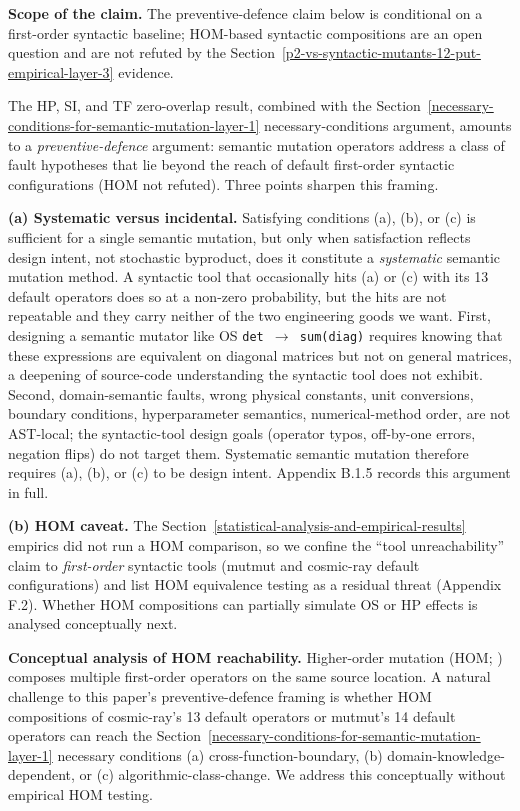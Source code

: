 \documentclass[manuscript,screen,review]{acmart}
\begin{document}
\textbf{Scope of the claim.} The preventive-defence claim below is
conditional on a first-order syntactic baseline; HOM-based syntactic
compositions are an open question and are not refuted by the Section~\ref{p2-vs-syntactic-mutants-12-put-empirical-layer-3}
evidence.

The HP, SI, and TF zero-overlap result, combined with the Section~\ref{necessary-conditions-for-semantic-mutation-layer-1}
necessary-conditions argument, amounts to a \emph{preventive-defence}
argument: semantic mutation operators address a class of fault
hypotheses that lie beyond the reach of default first-order syntactic
configurations (HOM not refuted). Three points sharpen
this framing.

\textbf{(a) Systematic versus incidental.} Satisfying conditions (a),
(b), or (c) is sufficient for a single semantic mutation, but only when
satisfaction reflects design intent, not stochastic byproduct, does it
constitute a \emph{systematic} semantic mutation method. A syntactic
tool that occasionally hits (a) or (c) with its 13 default operators
does so at a non-zero probability, but the hits are not repeatable and
they carry neither of the two engineering goods we want. First,
designing a semantic mutator like OS \texttt{det\ $\to$\ sum(diag)} requires
knowing that these expressions are equivalent on diagonal matrices but
not on general matrices, a deepening of source-code understanding the
syntactic tool does not exhibit. Second, domain-semantic faults, wrong
physical constants, unit conversions, boundary conditions,
hyperparameter semantics, numerical-method order, are not AST-local; the
syntactic-tool design goals (operator typos, off-by-one errors, negation
flips) do not target them. Systematic semantic mutation therefore
requires (a), (b), or (c) to be design intent. Appendix B.1.5 records
this argument in full.

\textbf{(b) HOM caveat.} The Section~\ref{statistical-analysis-and-empirical-results}
empirics did not run a HOM comparison, so we confine the ``tool
unreachability'' claim to \emph{first-order} syntactic tools (mutmut and
cosmic-ray default configurations) and list HOM equivalence testing as a
residual threat (Appendix F.2). Whether HOM
\citep{jia2009hom,kintis2018effective} compositions can partially
simulate OS or HP effects is analysed conceptually next.

\textbf{Conceptual analysis of HOM reachability.} Higher-order mutation
(HOM; \citealp{jia2008subtle,jia2009hom,kintis2018effective}) composes multiple first-order operators on the same
source location. A natural challenge to this paper's preventive-defence
framing is whether HOM compositions of cosmic-ray's
13 default operators or mutmut's 14 default operators can reach the Section~\ref{necessary-conditions-for-semantic-mutation-layer-1}
necessary conditions (a) cross-function-boundary, (b)
domain-knowledge-dependent, or (c) algorithmic-class-change. We address
this conceptually without empirical HOM testing.
\end{document}
